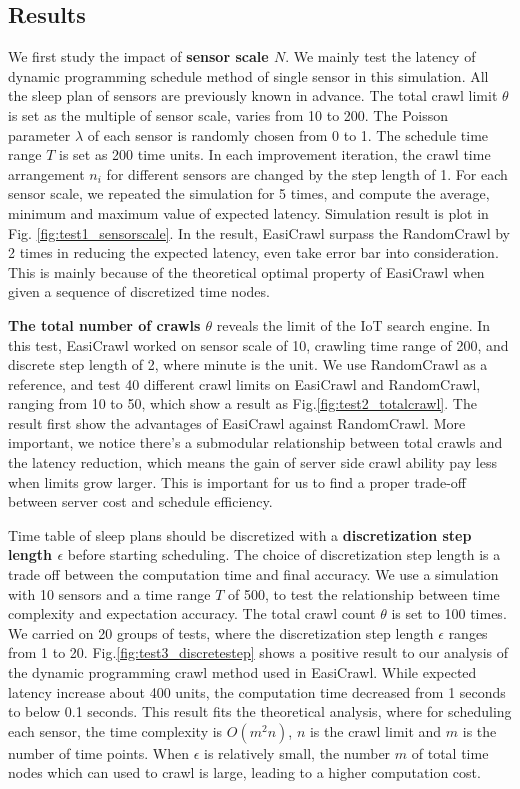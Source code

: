 \documentclass[conference]{IEEEtran}
\begin{document}
\subsection{Results}

We first study the impact of \textbf{sensor scale $N$}. 
We mainly test the latency of dynamic programming schedule method of single sensor in this simulation. 
All the sleep plan of sensors are previously known in advance.
The total crawl limit $\theta$ is set as the multiple of sensor scale, varies from 10 to 200. 
The Poisson parameter $\lambda$ of each sensor is randomly chosen from 0 to 1. 
The schedule time range $T$ is set as 200 time units. 
In each improvement iteration, the crawl time arrangement $n_i$ for different sensors are changed by the step length of 1. 
For each sensor scale, we repeated the simulation for 5 times, and compute the average, minimum and maximum value of expected latency. 
Simulation result is plot in Fig. \ref{fig:test1_sensorscale}.
In the result, EasiCrawl surpass the RandomCrawl by 2 times in reducing the expected latency, even take error bar into consideration. 
This is mainly because of the theoretical optimal property of EasiCrawl when given a sequence of discretized time nodes. 

\textbf{The total number of crawls $\theta$} reveals the limit of the IoT search engine.
In this test, EasiCrawl worked on sensor scale of 10, crawling time range of 200, and discrete step length of 2, where minute is the unit. 
We use RandomCrawl as a reference, and test 40 different crawl limits on EasiCrawl and RandomCrawl, ranging from 10 to 50, which show a result as Fig.\ref{fig:test2_totalcrawl}.
The result first show the advantages of EasiCrawl against RandomCrawl. 
More important, we notice there's a submodular relationship between total crawls and the latency reduction, which means the gain of server side crawl ability pay less when limits grow larger. 
This is important for us to find a proper trade-off between server cost and schedule efficiency.

Time table of sleep plans should be discretized with a \textbf{discretization step length $\epsilon$} before starting scheduling. 
The choice of discretization step length is a trade off between the computation time and final accuracy. 
We use a simulation with 10 sensors and a time range $T$ of 500, to test the relationship between time complexity and expectation accuracy. 
The total crawl count $\theta$ is set to 100 times.
We carried on 20 groups of tests, where the discretization step length $\epsilon$ ranges from 1 to 20.
Fig.\ref{fig:test3_discretestep} shows a positive result to our analysis of the dynamic programming crawl method used in EasiCrawl. 
While expected latency increase about 400 units, the computation time decreased from 1 seconds to below 0.1 seconds. 
This result fits the theoretical analysis, where for scheduling each sensor, the time complexity is $O(m^{2}n)$, $n$ is the crawl limit and $m$ is the number of time points.
When $\epsilon$ is relatively small, the number $m$ of total time nodes which can used to crawl is large, leading to a higher computation cost.
\end{document}
